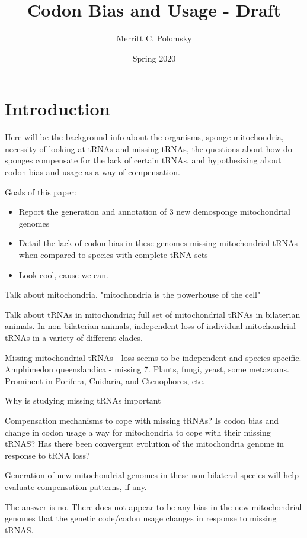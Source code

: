 \documentclass[12pt]{article}
\title{Codon Bias and Usage - Draft}
\author{Merritt C. Polomsky}
\date{Spring 2020}
\begin{document}
\maketitle

\section{Introduction}
Here will be the background info about the organisms, sponge
mitochondria, necessity of looking at tRNAs and missing tRNAs, the questions about how do sponges compensate for the lack of certain tRNAs, and hypothesizing about codon bias and usage as a way of compensation.

Goals of this paper:
\begin{itemize}
    \item Report the generation and annotation of 3 new demosponge mitochondrial genomes
    \item Detail the lack of codon bias in these genomes missing mitochondrial tRNAs when compared to species with complete tRNA sets
    \item Look cool, cause we can.
\end{itemize}

Talk about mitochondria, "mitochondria is the powerhouse of the cell"

Talk about tRNAs in mitochondria; full set of mitochondrial tRNAs in bilaterian animals. In non-bilaterian animals, independent loss of individual mitochondrial tRNAs in a variety of different clades.

Missing mitochondrial tRNAs - loss seems to be independent and species specific. Amphimedon queenslandica - missing 7. Plants, fungi, yeast, some metazoans. Prominent in Porifera, Cnidaria, and Ctenophores, etc.

Why is studying missing tRNAs important

Compensation mechanisms to cope with missing tRNAs? Is codon bias and change in codon usage a way for mitochondria to cope with their missing tRNAS? Has there been convergent evolution of the mitochondria genome in response to tRNA loss? 

Generation of new mitochondrial genomes in these non-bilateral species will help evaluate compensation patterns, if any. 

The answer is no. There does not appear to be any bias in the new mitochondrial genomes that the genetic code/codon usage changes in response to missing tRNAS.



\end{document}
